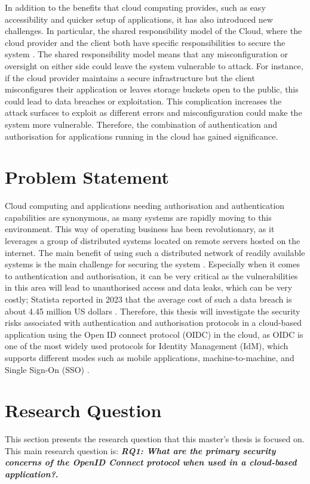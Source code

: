 In addition to the benefits that cloud computing provides, such as easy accessibility and quicker setup of applications, it has also introduced new challenges. In particular, the shared responsibility model of the Cloud, where the cloud provider and the client both have specific responsibilities to secure the system \citep{shared_principal}. The shared responsibility model means that any misconfiguration or oversight on either side could leave the system vulnerable to attack. For instance, if the cloud provider maintains a secure infrastructure but the client misconfigures their application or leaves storage buckets open to the public, this could lead to data breaches or exploitation. This complication increases the attack surfaces to exploit as different errors and misconfiguration could make the system more vulnerable. Therefore, the combination of authentication and authorisation for applications running in the cloud has gained significance. 


\section{Problem Statement}
Cloud computing and applications needing authorisation and authentication capabilities are synonymous, as many systems are rapidly moving to this environment. This way of operating business has been revolutionary, as it leverages a group of distributed systems located on remote servers hosted on the internet. The main benefit of using such a distributed network of readily available systems is the main challenge for securing the system \citep{Alouffi2021-yh}. Especially when it comes to authentication and authorisation, it can be very critical as the vulnerabilities in this area will lead to unauthorised access and data leaks, which can be very costly; Statista reported in 2023 that the average cost of such a data breach is about 4.45 million US dollars \citep{statista_data_breach}. Therefore, this thesis will investigate the security risks associated with authentication and authorisation protocols in a cloud-based application using the Open ID connect protocol (OIDC) in the cloud, as OIDC is one of the most widely used protocols for Identity Management (IdM), which supports different modes such as mobile applications, machine-to-machine, and Single Sign-On (SSO) \citep{oidc_popular}.

\section{Research Question}\label{sec:objectives}
This section presents the research question that this master's thesis is focused on. This main research question is:
\textbf{\textit{RQ1: What are the primary security concerns of the OpenID Connect protocol when used in a cloud-based application?}.}


